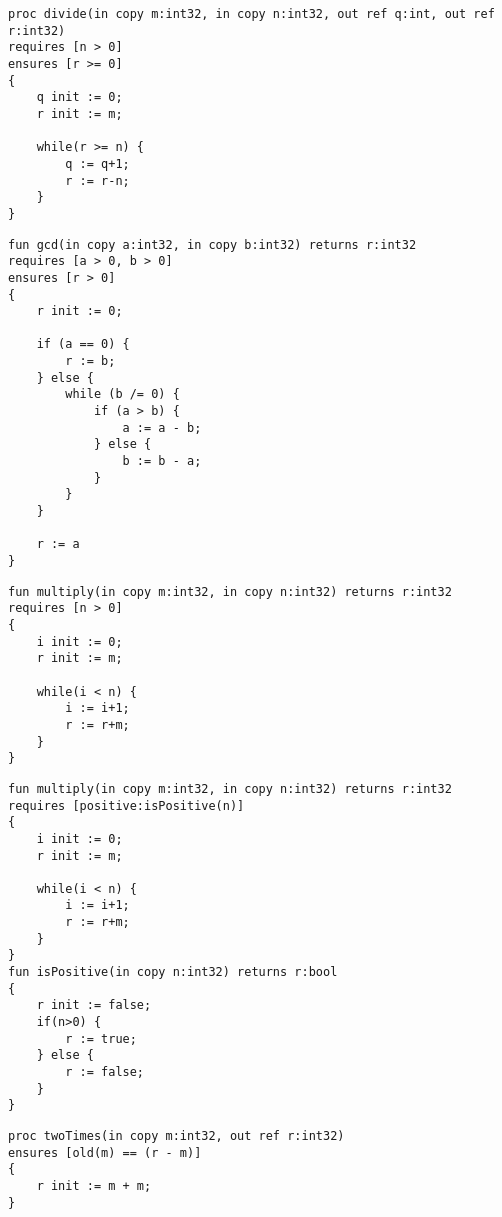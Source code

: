 
\begin{lstlisting}[caption=Pre-/postconditions in Prozeduren]
proc divide(in copy m:int32, in copy n:int32, out ref q:int, out ref r:int32)
requires [n > 0]
ensures [r >= 0]
{
    q init := 0;
    r init := m;

    while(r >= n) {
        q := q+1;
        r := r-n;
    }
}
\end{lstlisting}

\begin{lstlisting}[caption=Pre-/postconditions in Funktionen mit mehreren Conditions]
fun gcd(in copy a:int32, in copy b:int32) returns r:int32
requires [a > 0, b > 0]
ensures [r > 0]
{
    r init := 0;
    
    if (a == 0) {
        r := b;
    } else {
        while (b /= 0) {
            if (a > b) {
                a := a - b;
            } else {
                b := b - a;
            }
        }
    }

    r := a
}
\end{lstlisting}

\begin{lstlisting}[caption=Pre-/postconditions in Funktionen]
fun multiply(in copy m:int32, in copy n:int32) returns r:int32
requires [n > 0]
{
    i init := 0;
    r init := m;

    while(i < n) {
        i := i+1;
        r := r+m;
    }
}
\end{lstlisting}

\begin{lstlisting}[caption=Pre-/postconditions mit Funktion in der Condition List]
fun multiply(in copy m:int32, in copy n:int32) returns r:int32
requires [positive:isPositive(n)]
{
    i init := 0;
    r init := m;

    while(i < n) {
        i := i+1;
        r := r+m;
    }
}
fun isPositive(in copy n:int32) returns r:bool
{
    r init := false;
    if(n>0) {
        r := true;
    } else {
        r := false;
    }
}
\end{lstlisting}

\begin{lstlisting}[caption=Pre-/postconditions mit old Funktion]
proc twoTimes(in copy m:int32, out ref r:int32)
ensures [old(m) == (r - m)]
{
    r init := m + m;
}
\end{lstlisting}
